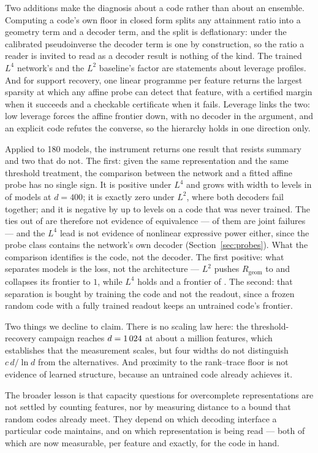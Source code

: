 Two additions make the diagnosis about a code rather than about an ensemble. Computing a code's
own floor in closed form splits any attainment ratio into a geometry term and a decoder term, and
the split is deflationary: under the calibrated pseudoinverse the decoder term is one by
construction, so the ratio a reader is invited to read as a decoder result is nothing of the
kind. The trained $L^4$ network's \EfiveLfourRatioPinvMean{} and the $L^2$ baseline's factor
\EfiveLtwoRatioLsMean{} are statements about leverage profiles. And for support recovery, one
linear programme per feature returns the largest sparsity at which any affine probe can detect
that feature, with a certified margin when it succeeds and a checkable certificate when it fails.
Leverage links the two: low leverage forces the affine frontier down, with no decoder in the
argument, and an explicit code refutes the converse, so the hierarchy holds in one direction
only.

Applied to 180 models, the instrument returns one result that resists summary and two that do not.
The first: given the same representation and the same threshold treatment, the comparison between the
network and a fitted affine probe has no single sign. It is positive under $L^4$ and grows with width
to \ScPrimDiff{} levels in \ScPrimNetWins{} of \ScSeeds{} models at $d=400$; it is exactly zero under
$L^2$, where both decoders fail together; and it is negative by up to
\PrimRandFourHundredDiff{} levels on a code that was never trained. The \PrimTies{} ties out of
\PrimModels{} are therefore not evidence of equivalence --- \PrimLtwoJointFailures{} of them are
joint failures --- and the $L^4$ lead is not evidence of nonlinear expressive power either, since the
probe class contains the network's own decoder (Section~\ref{sec:probes}). What the comparison
identifies is the code, not the decoder. The first positive: what separates
models is the loss, not the architecture --- $L^2$ pushes $R_{\mathrm{geom}}$ to
\SALtwoTwoHundredRgeom{} and collapses its frontier to $1$, while $L^4$ holds
\SALfourTwoHundredRgeom{} and a frontier of \FullLfourTwoHundredKappaMin{}. The second: that
separation is bought by training the code and not the readout, since a frozen random code with a
fully trained readout keeps an untrained code's frontier.

Two things we decline to claim. There is no scaling law here: the threshold-recovery campaign reaches
$d=1\,024$ at about a million features, which establishes that the measurement scales, but four
widths do not distinguish $c\,d/\ln d$ from the alternatives. And proximity to the rank--trace floor
is not evidence of learned structure, because an untrained code already achieves it.

The broader lesson is that capacity questions for overcomplete representations are not settled by
counting features, nor by measuring distance to a bound that random codes already meet. They depend
on which decoding interface a particular code maintains, and on which representation is being read ---
both of which are now measurable, per feature and exactly, for the code in hand.

